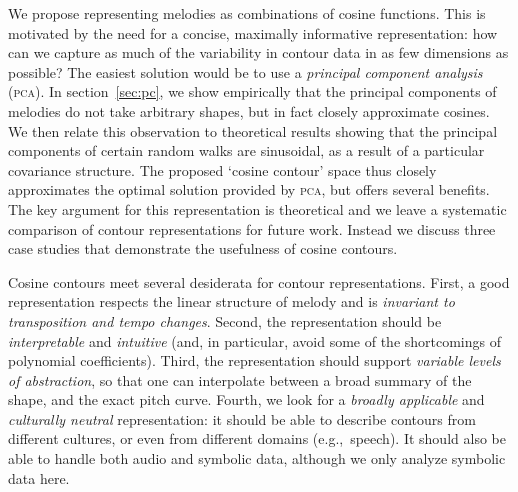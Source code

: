 \documentclass{article}
\begin{document}
We propose representing melodies as combinations of cosine functions.
This is motivated by the need for a concise, maximally informative representation: how can we capture as much of the variability in contour data in as few dimensions as possible?
The easiest solution would be to use a \emph{principal component analysis} (\textsc{pca}). 
In section~\ref{sec:pc}, we show empirically that the principal components of melodies do not take arbitrary shapes, but in fact closely approximate cosines. 
We then relate this observation to theoretical results showing that the principal components of certain random walks are sinusoidal, as a result of a particular covariance structure.
The proposed `cosine contour' space thus closely approximates the optimal solution provided by \textsc{pca}, but offers several benefits.
The key argument for this representation is theoretical and
we leave a systematic comparison of contour representations for future work. 
Instead we discuss three case studies that demonstrate the usefulness of cosine contours.


Cosine contours meet several desiderata for contour representations.
First, a good representation respects the linear structure of melody and is \emph{invariant to transposition and tempo changes}.
Second, the representation should be \emph{interpretable} and \emph{intuitive} (and,
in particular, avoid some of the shortcomings of polynomial coefficients).
Third, the representation should support \emph{variable levels of abstraction}, so that one can interpolate between a broad summary of the shape, and the exact pitch curve.
Fourth, we look for a \emph{broadly applicable} and \emph{culturally neutral} representation: it should be able to describe contours from different cultures, or even from different domains (e.g.,~speech). It should also be able to handle both audio and symbolic data, although we only analyze symbolic data here.
\end{document}
